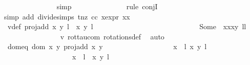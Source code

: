 \begin{isabellebody}
\ \ \ \ \ \ \ \ \ \ \ \ \ \ \isamarkupfalse%
{\isacharparenleft}simp{\isacharparenright}\isanewline
\ \ \ \ \ \ \ \ \ \ \ \ \ \ \isamarkupfalse%
{\isacharparenleft}rule\ conjI{\isacharparenright}\isanewline
\ \ \ \ \ \ \ \ \ \ \ \ \ \ \isamarkupfalse%
{\isacharparenleft}simp\ add{\isacharcolon}\ divide{\isacharunderscore}simps\ t{\isacharunderscore}nz\ cc\ x{\isacharunderscore}expr\ {\isacartoucheopen}x{\isacharasterisk}x\ {\isacharequal}\ {}{\isacartoucheclose}{\isacharparenright}{\isacharplus}\isanewline
\ \ \ \ \ \ \ \ \ \ \ \ \isamarkupfalse%
\ \isamarkupfalse%
\ v{}{\isacharunderscore}def{\isacharcolon}\ {\isachardoublequoteopen}proj{\isacharunderscore}add\ {\isacharparenleft}{\isacharparenleft}x{\isacharcomma}\ y{\isacharparenright}{\isacharcomma}\ l{\isacharparenright}\ {\isacharparenleft}{\isasymtau}\ {\isacharparenleft}x{\isacharprime}{\isacharcomma}\ y{\isacharprime}{\isacharparenright}{\isacharcomma}\ l{\isacharprime}\ {\isacharplus}\ {}{\isacharparenright}\ {\isacharequal}\isanewline
\ \ \ \ \ \ \ \ \ \ \ \ \ \ \ \ \ \ \ \ \ \ \ \ \ \ Some\ {\isacharparenleft}{\isasymtau}\ {\isacharparenleft}x{\isacharasterisk}x{\isacharprime}{\isacharcomma}x{\isacharasterisk}y{\isacharprime}{\isacharparenright}{\isacharcomma}\ l{\isacharplus}l{\isacharprime}{\isacharplus}{}{\isacharparenright}{\isachardoublequoteclose}\isanewline
\ \ \ \ \ \ \ \ \ \ \ \ \ \ \isamarkupfalse%
\ v{}\ rot{\isacharunderscore}tau{\isacharunderscore}com\ rotations{\isacharunderscore}def\ \isamarkupfalse%
\ auto\isanewline
\ \ \ \ \ \ \ \ \ \ \ \ \isamarkupfalse%
\ dom{\isacharunderscore}eq{\isacharcolon}\ {\isachardoublequoteopen}{\isacharparenleft}dom\ {\isacharparenleft}{\isasymlambda}{\isacharparenleft}x{\isacharcomma}\ y{\isacharparenright}{\isachardot}\ proj{\isacharunderscore}add\ x\ y{\isacharparenright}\ {\isasyminter}\isanewline
\ \ \ \ \ \ \ \ \ \ \ \ \ \ \ \ \ \ {\isacharbraceleft}{\isacharparenleft}{\isacharparenleft}{\isacharparenleft}x{\isacharcomma}\ {}{\isacharparenright}{\isacharcomma}\ l{\isacharparenright}{\isacharcomma}\ {\isacharparenleft}x{\isacharprime}{\isacharcomma}\ y{\isacharprime}{\isacharparenright}{\isacharcomma}\ l{\isacharprime}{\isacharparenright}{\isacharcomma}\isanewline
\ \ \ \ \ \ \ \ \ \ \ \ \ \ \ \ \ \ \ {\isacharparenleft}{\isacharparenleft}{\isacharparenleft}x{\isacharcomma}\ {}{\isacharparenright}{\isacharcomma}\ l{\isacharparenright}{\isacharcomma}\ {\isasymtau}\ {\isacharparenleft}x{\isacharprime}{\isacharcomma}\ y{\isacharprime}{\isacharparenright}{\isacharcomma}\ l{\isacharprime}\ {\isacharplus}\ {}{\isacharparenright}{\isacharbraceright}{\isacharparenright}\ {\isacharequal}\ \isanewline

\end{isabellebody}
